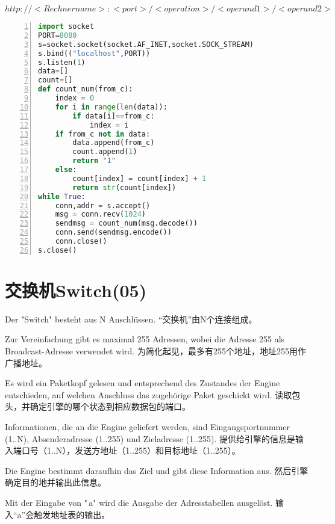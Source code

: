 \documentclass[fleqn]{article}
\begin{document}
$http: //< Rechnername >:< port >/< operation >/< operand1>/< operand2>$

\begin{lstlisting}[language = Python, numbers=left, 
    numberstyle=\tiny,keywordstyle=\color{blue!70},
    commentstyle=\color{red!50!green!50!blue!50},frame=shadowbox,
    rulesepcolor=\color{red!20!green!20!blue!20},basicstyle=\ttfamily]
import socket
PORT=8080
s=socket.socket(socket.AF_INET,socket.SOCK_STREAM)
s.bind(("localhost",PORT))
s.listen(1)
data=[]
count=[]
def count_num(from_c):
    index = 0
    for i in range(len(data)):
        if data[i]==from_c:
            index = i
    if from_c not in data:
        data.append(from_c)
        count.append(1)
        return "1"
    else:
        count[index] = count[index] + 1
        return str(count[index])
while True:
    conn,addr = s.accept()
    msg = conn.recv(1024)
    sendmsg = count_num(msg.decode())
    conn.send(sendmsg.encode())
    conn.close()
s.close()
\end{lstlisting}

\clearpage
\section{交换机Switch(05)}

Der "Switch" besteht aus N Anschlüssen. “交换机”由N个连接组成。

Zur Vereinfachung gibt es maximal 255 Adressen, wobei die Adresse 255 als Broadcast-Adresse verwendet wird.
为简化起见，最多有255个地址，地址255用作广播地址。

Es wird ein Paketkopf gelesen und entsprechend des Zustandes der Engine entschieden, auf welchen Anschluss das zugehörige Paket geschickt wird.
读取包头，并确定引擎的哪个状态到相应数据包的端口。

Informationen, die an die Engine geliefert werden, sind Eingangsportnummer (1..N), Absenderadresse (1..255) und Zieladresse (1..255).
提供给引擎的信息是输入端口号（1..N），发送方地址（1..255）和目标地址（1..255）。

Die Engine bestimmt daraufhin das Ziel und gibt diese Information aus.
然后引擎确定目的地并输出此信息。

Mit der Eingabe von "\,a" wird die Ausgabe der Adresstabellen ausgelöst.
输入“a”会触发地址表的输出。
\end{document}
